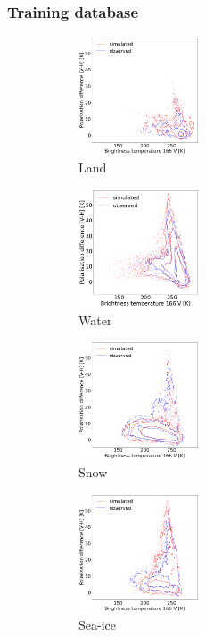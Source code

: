 \documentclass[12pt,oneside,a4paper]{article}
\begin{document}
\subsubsection{Training database}
%
\begin{figure}[t]
	\centering
	\begin{subfigure}{.24\textwidth}
		\caption{Land}
		\includegraphics[height =35mm]{Figures/hist2d_gmi_45-60_land.png}
	\end{subfigure}
	\begin{subfigure}{.24\textwidth}
		\caption{Water}
		\includegraphics[height = 35mm]{Figures/hist2d_gmi_45-60_sea.png}
	\end{subfigure}
	\begin{subfigure}{.24\textwidth}
	\caption{Snow}
	\includegraphics[height = 35mm]{Figures/hist2d_gmi_45-60_snow.png}
\end{subfigure}
\begin{subfigure}{.24\textwidth}
	\caption{ Sea-ice}
	\includegraphics[height = 35mm]{Figures/hist2d_gmi_highlat_sea-ice.png}
\end{subfigure}
	\label{fig:histogram_2d}
	\caption{}
\end{figure}
\end{document}
